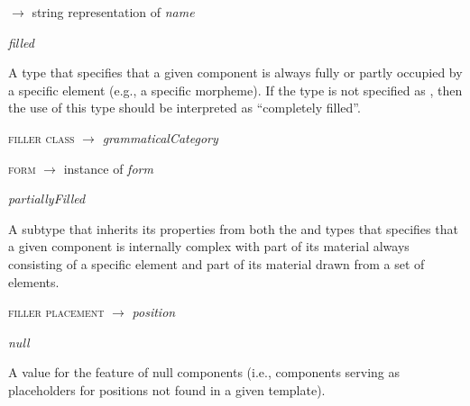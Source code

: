 \begin{ontologytop}
\begin{proplist}
	\item \textsc{\name} $\rightarrow$ string representation of \emph{name}

	\end{proplist}

	\begin{classlist}

	\item \emph{filled}
	\hspace{1em}\parbox[t]{\linegoal}{\footnotesize A type that specifies that a given component is always fully or partly occupied by a specific element (e.g., a specific morpheme). If the type is not specified as , then the use of this type should be interpreted as ``completely filled''.}


		\begin{proplist}

		\item \textsc{filler class} $\rightarrow$  \emph{grammaticalCategory}

		\item \textsc{form} $\rightarrow$ instance of \emph{form}

		\end{proplist}

		\begin{classlist}

		\item \emph{partiallyFilled}
		\hspace{1em}\parbox[t]{\linegoal}{\footnotesize A subtype that inherits its properties from both the  and  types that specifies that a given component is internally complex with part of its material always consisting of a specific element and part of its material drawn from a set of elements.}


			\begin{proplist}

			\item \textsc{filler placement} $\rightarrow$  \emph{position}

			\end{proplist}

		\end{classlist}

	\item \emph{null}
	\hspace{1em}\parbox[t]{\linegoal}{\footnotesize A value for the  feature of {null} components (i.e., components serving as placeholders for positions not found in a given template).}



\end{classlist}
\end{ontologytop}

